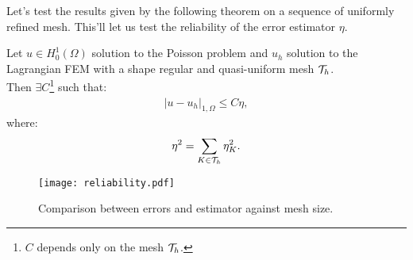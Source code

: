 Let's test the results given by the following theorem on a sequence of uniformly refined mesh. This'll let us test the reliability of the error estimator $\eta$.

\begin{theorem*}[Reliability]
	Let $u \in H_0^1(\Omega)$ solution to the Poisson problem and $u_h$ solution to the Lagrangian FEM with a shape regular and quasi-uniform mesh $\mathcal{T}_h$. \\
	Then $\exists C$\footnote{$C$ depends only on the mesh $\mathcal{T}_h$.} such that:
	\begin{gather}
		\lvert u - u_h \rvert_{1, \Omega} \leq C \eta,
	\end{gather}
	where:
	\begin{gather}
		\eta^2 = \sum_{K \in \mathcal{T}_h} \eta_K^2.
	\end{gather}
\end{theorem*}

\begin{figure}[!ht]
	\centering
	\texttt{[image: reliability.pdf]}
	\caption{Comparison between errors and estimator against mesh size.}
\end{figure}

\newpage
